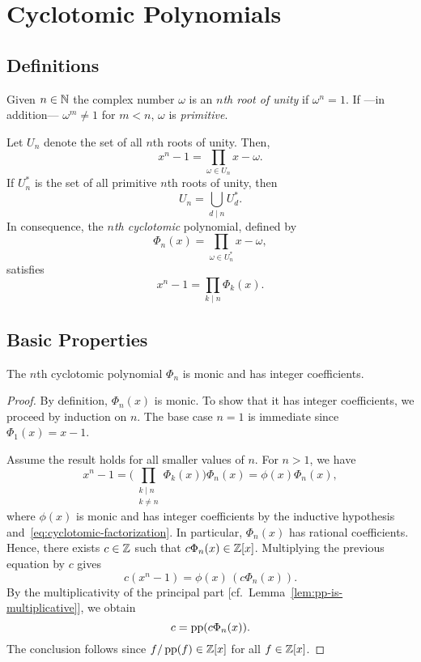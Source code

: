 \chapter{Cyclotomic Polynomials}

\section{Definitions}

Given $n\in\mathbb{N}$ the complex number $\omega$ is an \textsl{$n$th root of unity} if $\omega^n=1$. If ---in addition--- $\omega^m\ne1$ for $m<n$, $\omega$ is \textsl{primitive}.

Let $U_n$ denote the set of all $n$th roots of unity. Then,
\[
    x^n-1=\prod_{\omega\in U_n}x-\omega.
\]
If $U_n^*$ is the set of all primitive $n$th roots of unity, then
\[
    U_n = \bigcup_{d\mid n}U_d^*.
\]
In consequence, the \textsl{$n$th cyclotomic} polynomial, defined by
\[
    \Phi_n(x) = \prod_{\omega\in U_n^*}x-\omega,
\]
satisfies
\begin{equation}\tag{$\ast$}\label{eq:cyclotomic-factorization}
    x^n-1 = \prod_{k\mid n}\Phi_k(x).
\end{equation}

\section{Basic Properties}

\begin{lem}\label{lem:cyclotomic-are-integer}
    The\/ $n$th cyclotomic polynomial\/ $\Phi_n$ is monic and has integer coefficients.
\end{lem}

\begin{proof}
    By definition, $\Phi_n(x)$ is monic. To show that it has integer coefficients, we proceed by induction on\/ $n$.  
    The base case $n=1$ is immediate since $\Phi_1(x)=x-1$.

    Assume the result holds for all smaller values of\/ $n$.  
    For $n>1$, we have
    \begin{equation}\label{eq:cyclotomic-factor}
        x^n-1 = \Bigg(
                \prod_{\substack{k\mid n\\k\ne n}}
            \Phi_k(x)\Bigg)\Phi_n(x)
            =\phi(x)\Phi_n(x),
    \end{equation}
    where $\phi(x)$ is monic and has integer coefficients by the inductive hypothesis and~\eqref{eq:cyclotomic-factorization}. In particular, $\Phi_n(x)$ has rational coefficients.  
    Hence, there exists\/ $c\in\mathbb{Z}$ such that\/ $c\Phi_n(x)\in\mathbb{Z}[x]$. Multiplying the previous equation by\/ $c$ gives
    \[
        c(x^n-1)=\phi(x)\,(c\Phi_n(x)).
    \]
    By the multiplicativity of the principal part [cf.~Lemma~\ref{lem:pp-is-multiplicative}], we obtain
    \[
        c=\operatorname{pp}(c\Phi_n(x)).
    \]
    The conclusion follows since\/ $f/\operatorname{pp}(f)\in\mathbb{Z}[x]$ for all\/ $f\in\mathbb{Z}[x]$.
\end{proof}

